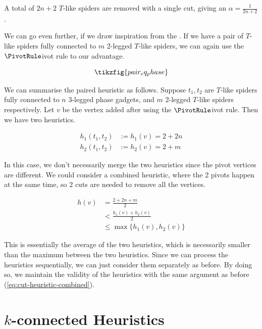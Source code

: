A total of $2n+2$ $T$-like spiders are removed with a single cut, giving an $\alpha = \frac{1}{2n+2}$.

We can go even further, if we draw inspiration from the .
If we have a pair of $T$-like spiders fully connected to $m$ 2-legged $T$-like spiders,
we can again use the $\PivotRule$ivot rule to our advantage.

\begin{equation}
    \tikzfig{pair_eq_phase}
\end{equation}

We can summarise the paired heuristic as follows.
Suppose $t_1,t_2$ are $T$-like spiders fully connected to $n$ 3-legged phase gadgets,
and $m$ 2-legged $T$-like spiders respectively.
Let $v$ be the vertex added after using the $\PivotRule$ivot rule.
Then we have two heuristics.

\begin{equation}
\begin{aligned}
    \label{eq:cut-heuristic-pair}
    h_1(t_1,t_2) &:= h_1(v) = 2 + 2n \\
    h_2(t_1,t_2) &:= h_2(v) =  2 + m
\end{aligned}
\end{equation}

In this case, we don't necessarily merge the two heuristics since the pivot vertices are different.
We could consider a combined heuristic, where the 2 pivots happen at the same time,
so 2 cuts are needed to remove all the vertices.

\begin{equation}
\begin{aligned}
    h(v) &= \frac{2 + 2n + m}{2} \\
    &< \frac{h_1(v) + h_2(v)}{2} \\
    &\leq \max\{h_1(v), h_2(v)\}
\end{aligned}
\end{equation}

This is essentially the average of the two heuristics, 
which is necessarily smaller than the maximum between the two heuristics.
Since we can process the heuristics sequentially, we can just consider them separately as before.
By doing so, we maintain the validity of the heuristics with the same argument as before 
(\ref{eq:cut-heuristic-combined}).

\section{$k$-connected Heuristics}
\label{sec:k-connected-heuristics}

